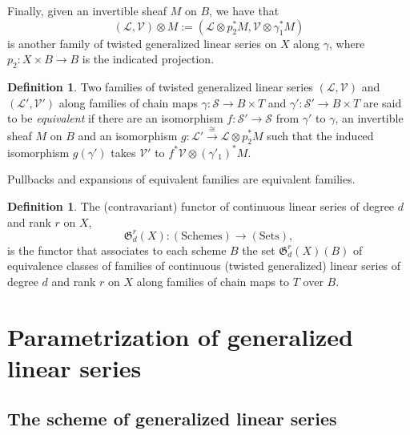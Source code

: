 \documentclass[a4paper,11pt]{amsart}
\theoremstyle{plain}
\theoremstyle{definition}
\newtheorem{defn}[thm]{Definition}
\theoremstyle{remark}
\def\L{\mathcal{L}}
\def\V{\mathcal{V}}
\def\:{\colon}
\begin{document}
Finally, given an invertible sheaf $M$ on $B$, we have that 
\[
(\L,\V)\otimes M:=(\L\otimes p_2^*M,\V\otimes\gamma_1^*M)
\]
is another family of twisted generalized linear series on $X$ along $\gamma$, where $p_2\:X\times B\to B$ is the indicated projection.

\begin{defn}\label{tglsequiv} Two families of twisted generalized linear series $(\L,\V)$ and $(\L',\V')$ along families of chain maps $\gamma\colon\mathcal S\to B\times T$ and $\gamma'\colon\mathcal S'\to B\times T$ are said to be \emph{equivalent} if there are an isomorphism $f\colon\mathcal S'\to\mathcal S$ from $\gamma'$ to $\gamma$, an invertible sheaf $M$ on $B$ and an isomorphism $g\:\L'\xrightarrow{\cong}\L\otimes p_2^*M$ such that the induced isomorphism $g(\gamma')$ takes $\V'$ to $f^*\V\otimes(\gamma'_1)^*M$.
\end{defn}

Pullbacks and expansions of equivalent families are equivalent families.

\begin{defn}\label{thefunctor} The (contravariant) functor of
continuous linear series of degree $d$ and
rank $r$ on $X$,
$$
\mathfrak{G}_d^r(X)\colon (\text{Schemes})
\longrightarrow(\text{Sets}),
$$
is the functor that associates to each scheme $B$ the
set $\mathfrak{G}_d^r(X)(B)$ of equivalence classes of families of 
continuous (twisted generalized) linear series of degree $d$ and rank $r$ on $X$ along families of chain maps to $T$ over $B$.
\end{defn}

\section{Parametrization of generalized linear series}\label{gls}

\subsection{The scheme of generalized linear series}\label{gls-sch}
\end{document}
